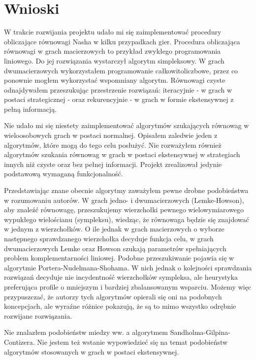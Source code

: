 \documentclass[polish]{standalone}
\begin{document}
\pagestyle{headings}

\chapter{Wnioski}

W trakcie rozwijania projektu udało mi się zaimplementować procedury obliczające równowagi Nasha w kilku przypadkach
gier. Procedura obliczająca równowagi w grach macierzowych to przykład zwykłego programowania liniowego. Do jej
rozwiązania wystarczył algorytm simpleksowy. W grach dwumacierzowych wykorzystałem programowanie całkowitoliczbowe,
przez co ponownie mogłem wykorzystać wspomniany algorytm. Równowagi czyste odnajdywałem przeszukując przestrzenie
rozwiązań: iteracyjnie - w grach w postaci strategicznej - oraz rekurencyjnie - w grach w formie ekstensywnej z pełną
informacją.

Nie udało mi się niestety zaimplementować algorytmów szukających równowag w wieloosobowych grach w postaci normalnej.
Opisałem zaledwie jeden z algorytmów, które mogą do tego celu posłużyć. Nie rozważyłem również algorytmów szukania
równowag w grach w postaci ekstensywnej w strategiach innych niż czyste oraz bez pełnej informacji. Projekt zrealizował
jedynie podstawową wymaganą funkcjonalność.

Przedstawiając znane obecnie algorytmy zaważyłem pewne drobne podobieństwa w rozumowaniu autorów. W grach jedno- i
dwumacierzowych (Lemke-Howson), aby znaleźć równowagę, przeszukujemy wierzchołki pewnego wielowymiarowego wypukłego
wielościanu (sympleksu), wiedząc, że równowaga będzie się znajdować w jednym z wierzchołków. O ile jednak w grach
macierzowych o wyborze następnego sprawdzanego wierzchołka decyduje funkcja celu, w grach dwumacierzowych Lemke oraz
Howson szukają parametrów spełniających problem komplementarności liniowej. Podobne przeszukiwanie pojawia się w
algorytmie Portera-Nudelmana-Shohama. W nich jednak o kolejności sprawdzania rozwiązań decyduje nie incydentność
wierzchołków sympleksa, ale heurystyka preferująca profile o mniejszym i bardziej zbalansowanym wsparciu. Możemy więc
przypuszczać, że autorzy tych algorytmów opierali się oni na podobnych koncepcjach, ale wyraźne różnice pokazują, że są
to mimo wszystko odrębnie rozwijane rozwiązania.

Nie znalazłem podobieństw miedzy ww. a algorytmem Sandholma-Gilpina-Contizera. Nie jestem też wstanie wypowiedzieć się
na temat podobieństw algorytmów stosowanych w grach w postaci ekstensywnej.
\end{document}
